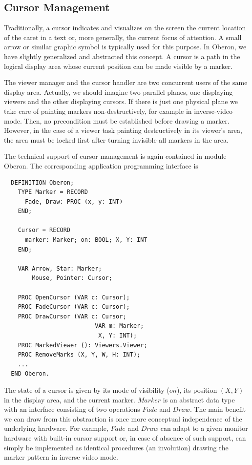 \subsection{Cursor Management}
Traditionally, a cursor indicates and visualizes on the screen the current location of the caret in a
text or, more generally, the current focus of attention. A small arrow or similar graphic symbol is
typically used for this purpose. In Oberon, we have slightly generalized and abstracted this
concept. A cursor is a path in the logical display area whose current position can be made visible
by a marker.

The viewer manager and the cursor handler are two concurrent users of the same display area.
Actually, we should imagine two parallel planes, one displaying viewers and the other displaying
cursors. If there is just one physical plane we take care of painting markers non-destructively, for
example in inverse-video mode. Then, no precondition must be established before drawing a
marker. However, in the case of a viewer task painting destructively in its viewer's area, the area
must be locked first after turning invisible all markers in the area.

The technical support of cursor management is again contained in module Oberon. The
corresponding application programming interface is
\begin{verbatim}
  DEFINITION Oberon;
    TYPE Marker = RECORD
      Fade, Draw: PROC (x, y: INT)
    END;

    Cursor = RECORD
      marker: Marker; on: BOOL; X, Y: INT
    END;

    VAR Arrow, Star: Marker;
        Mouse, Pointer: Cursor;

    PROC OpenCursor (VAR c: Cursor);
    PROC FadeCursor (VAR c: Cursor);
    PROC DrawCursor (VAR c: Cursor;
                          VAR m: Marker;
                           X, Y: INT);
    PROC MarkedViewer (): Viewers.Viewer;
    PROC RemoveMarks (X, Y, W, H: INT);
    ...
  END Oberon.
\end{verbatim}
The state of a cursor is given by its mode of visibility ($on$), its position $(X, Y)$ in the display area,
and the current marker. $Marker$ is an abstract data type with an interface consisting of two
operations $Fade$ and $Draw$. The main benefit we can draw from this abstraction is once more
conceptual independence of the underlying hardware. For example, $Fade$ and $Draw$ can adapt to
a given monitor hardware with built-in cursor support or, in case of absence of such support, can
simply be implemented as identical procedures (an involution) drawing the marker pattern in
inverse video mode.

